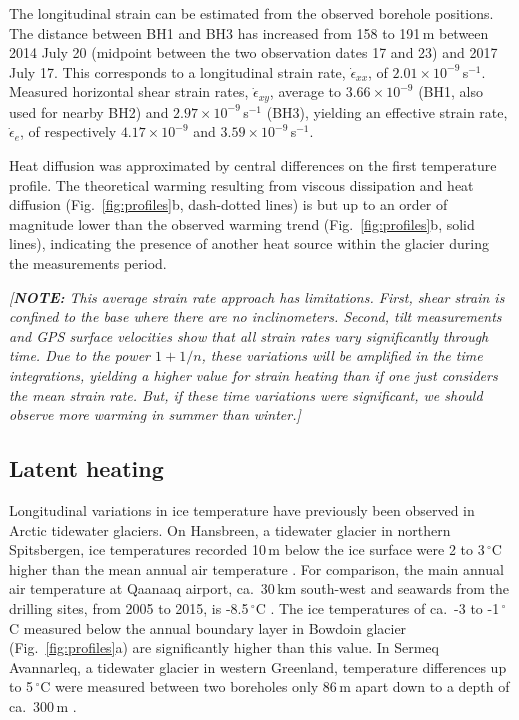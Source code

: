\documentclass[utf8]{article}
\newcommand{\note}[1]{\textcolor{c0}{\emph{[\textbf{NOTE:} #1]}}}
\begin{document}
    The longitudinal strain can be estimated from the observed borehole
    positions. The distance between BH1 and BH3
    has increased from 158 to 191\,m between 2014 July 20 (midpoint
    between the two observation dates 17 and 23) and 2017 July 17. This
    corresponds to a longitudinal strain rate, $\dot\epsilon_{xx}$, of
    $2.01\times10^{-9}$\,s$^{-1}$. Measured horizontal shear strain rates,
    $\dot\epsilon_{xy}$, average to $3.66\times10^{-9}$ (BH1, also used for
    nearby BH2) and $2.97\times10^{-9}$\,s$^{-1}$ (BH3), yielding an effective
    strain rate, $\dot\epsilon_e$, of respectively $4.17\times10^{-9}$ and
    $3.59\times10^{-9}$\,s$^{-1}$.

    Heat diffusion was approximated by central differences on the first
    temperature profile. The theoretical warming resulting from viscous
    dissipation and heat diffusion (Fig.~\ref{fig:profiles}b, dash-dotted
    lines) is but up to an order of magnitude lower than the observed warming
    trend (Fig.~\ref{fig:profiles}b, solid lines), indicating the presence of
    another heat source within the glacier during the measurements period.

    \note{This average strain rate approach has limitations. First, shear
          strain is confined to the base where there are no inclinometers.
          Second, tilt measurements and GPS surface velocities show that all
          strain rates vary significantly through time. Due to the power
          $1+1/n$, these variations will be amplified in the time integrations,
          yielding a higher value for strain heating than if one just considers
          the mean strain rate. But, if these time variations were significant,
          we should observe more warming in summer than winter.}


\subsection{Latent heating}

    Longitudinal variations in ice temperature have previously been observed in
    Arctic tidewater glaciers. On Hansbreen, a tidewater glacier in northern
    Spitsbergen, ice temperatures recorded 10\,m below the ice surface were 2
    to 3\,$^\circ$C higher than the mean annual air temperature
    \citep{Jania.etal.1996}.
    For comparison, the main annual air temperature at Qaanaaq airport,
    ca.~30\,km south-west and seawards from the drilling sites, from 2005 to
    2015, is -8.5\,$^\circ$C \citep{Sugiyama.etal.2014, Tsutaki.etal.2017}. The
    ice temperatures of ca.~-3 to -1\,$^\circ$C measured below the annual
    boundary layer in Bowdoin glacier (Fig.~\ref{fig:profiles}a) are
    significantly higher than this value. In Sermeq Avannarleq, a tidewater
    glacier in
    western Greenland, temperature differences up to 5\,$^\circ$C were measured
    between two boreholes only 86\,m apart down to a depth of ca.~300\,m
    \citep{Luthi.etal.2015}.
\end{document}
